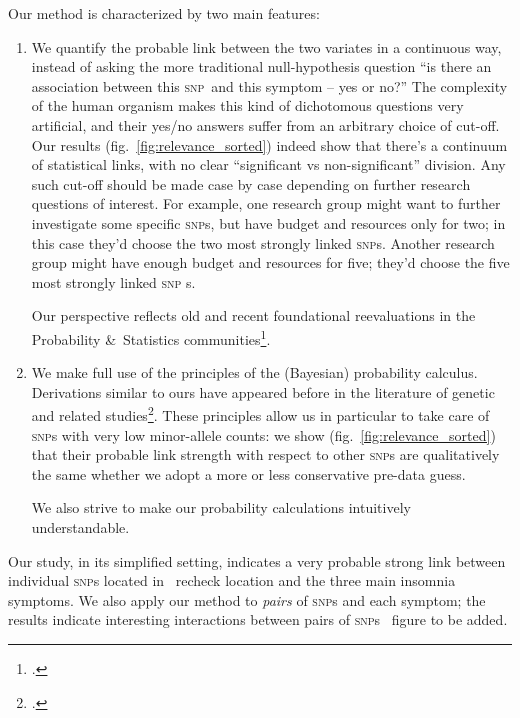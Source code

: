 \documentclass[\ifafour a4paper,12pt,\else a5paper,10pt,\fi%
onecolumn,oneside,article,%
british%
]{memoir}
\theoremstyle{remark}
\theoremstyle{innote}
\newcommand*{\citep}{\footcites}
\newcommand*{\amp}{\&}
\renewcommand*{\|}[1][]{\nonscript\,#1\vert\nonscript\;\mathopen{}}
\newcommand*{\fig}{fig.}%
\newcommand*{\puzzle}{{\fontencoding{U}\fontfamily{fontawesometwo}\selectfont\symbol{225}}}
\newcommand{\mynote}[1]{ {\color{notecolour}\puzzle\ #1}}
\newcommand*{\snp}{\textsc{snp}}
\begin{document}
Our method is characterized by two main features:
\begin{enumerate}[wide]
\item We quantify the probable link between the two variates in a
  continuous way, instead of asking the more traditional null-hypothesis
  question \enquote{is there an association between this \snp\ and this
    symptom -- yes or no?} The complexity of the human organism makes this
  kind of dichotomous questions very artificial, and their yes/no answers
  suffer from an arbitrary choice of cut-off. Our results
  (\fig~\ref{fig:relevance_sorted}) indeed show that there's a continuum of
  statistical links, with no clear \enquote{significant vs non-significant}
  division. Any such cut-off should be made case by case depending on
  further research questions of interest. For example, one research group
  might want to further investigate some specific \snp s, but have budget
  and resources only for two; in this case they'd choose the two most
  strongly linked \snp s. Another research group might have enough budget
  and resources for five; they'd choose the five most strongly linked \snp
  s.

  Our perspective reflects old and recent foundational reevaluations in the
  Probability \amp\ Statistics
  communities\citep{asa2016,asa2019,amrheinetal2019}[see
  also Kadane in][pp.~347--348]{coxetal1987}{bergeretal1988,johnson1999}[Box~3
  p.~687]{stephensetal2003}.

\item We make full use of the principles of the (Bayesian) probability
  calculus. Derivations similar to ours have appeared before in the
  literature of genetic and related
  studies\citep{lange1995,lange1997_r2003,lewingeretal2007,stingoetal2015}[see
  also refs in][]{stephensetal2009}. These principles allow us in
  particular to take care of \snp s with very low minor-allele counts: we
  show (\fig~\ref{fig:relevance_sorted}) that their probable link strength
  with respect to other \snp s are qualitatively the same whether we adopt
  a more or less conservative pre-data guess.

  We also strive to make our probability calculations intuitively
  understandable.
\end{enumerate}

Our study, in its simplified setting, indicates a very probable strong link
between individual \snp s located in \mynote{recheck location} and the
three main insomnia symptoms. We also apply our method to \emph{pairs} of
\snp s and each symptom; the results indicate interesting interactions
between pairs of \snp s \mynote{figure to be added}.
\end{document}
